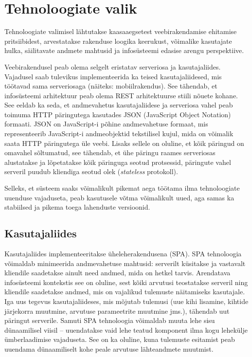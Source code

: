 \section{Tehnoloogiate valik}
Tehnoloogiate valimisel lähtutakse kaasaaegsetest veebirakendamise ehitamise pritsiibidest, arvestatakse
rakenduse loogika keerukust, võimalike kasutajate hulka, säilitavate andmete mahtusid ja infosüsteemi
edasise arengu perspektiive. 

Veebirakendusel peab olema selgelt eristatav serveriosa ja kasutajaliides. Vajadusel saab tulevikus 
implementeerida ka teised kasutajaliidesed, mis töötavad sama serveriosaga (näiteks: mobiilrakendus).
See tähendab, et infosüsteemi arhitektuur peab olema REST arhitektuurse stiili nõuete kohane. See eeldab
ka seda, et andmevahetus kasutajaliidese ja serveriosa vahel peab toimuma HTTP päringutega kasutades 
JSON (JavaScript Object Notation) formaati. JSON on JavaScript-i põhine andmevahetuse formaat, mis 
representeerib JavaScript-i andmeobjektid tekstilisel kujul, mida on võimalik saata HTTP 
päringutega üle veebi.
Lisaks sellele on oluline, et kõik päringud on omavahel sõltumatud, see tähendab, et ühe 
päringu raames serveriosas alustatakse ja lõpetatakse kõik päringuga seotud protsessid, päringute 
vahel serveril puudub kliendiga seotud olek (\textit{stateless} protokoll).

Selleks, et süsteem saaks võimalikult pikemat aega töötama ilma tehnoloogiate uuenduse vajaduseta,
peab kasutusele võtma võimalikult uued, aga samas ka stabiilsed ja pikema toega lahenduste versioonid. 
 

\subsection{Kasutajaliides}
Kasutajaliides implementeeritakse üheleherakendusena (SPA). SPA tehnoloogia võimaldab minimeerida 
andmevahetuse mahtusid: serverilt küsitakse ja vastavalt kliendile saadetakse ainult need andmed, 
mida on hetkel tarvis. Arendatava infosüsteemi kontekstis see on oluline, sest kõiki arvutusi 
teostatakse serveril ning kliendile saadetakse andmed, mis on vajalikud tulemuste näitamiseks 
kasutajale. Iga uus tegevus kasutajaliideses, mis mõjutab tulemusi (uue kihi lisamine, 
kihtide järjekorra muutmine, arvutuse parameetrite muutmine jms.), tähendab uut päringut serverile. 
Samuti SPA tehnoloogia võimaldab muuta lehe sisu dünaamilisel viisil -- uuendatakse vaid lehe teatud
komponent ilma kogu lehekülje ümberlaadimise vajaduseta. See on ka oluline, kuna tulemuste esitamist 
peab uuendama dünaamiliselt kohe peale arvutuse lähteandmete muutmist.

